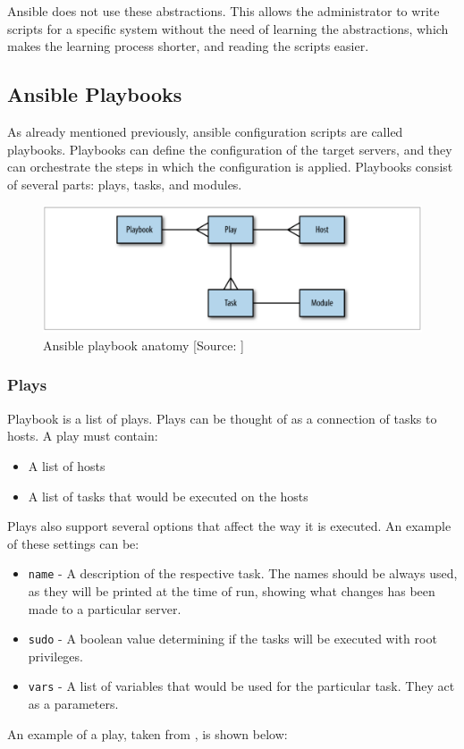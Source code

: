 Ansible does not use these abstractions. This allows the administrator to write scripts for a specific system without the need of learning the abstractions, which makes the learning process shorter, and reading the scripts easier. \cite{UpAndRunning}


\subsection{Ansible Playbooks}
As already mentioned previously, ansible configuration scripts are called playbooks. Playbooks can define the configuration of the target servers, and they can orchestrate the steps in which the configuration is applied. Playbooks consist of several parts: plays, tasks, and modules. \cite{UpAndRunning} \cite{AnsibleDoc}

\begin{figure}[!h]
  \includegraphics[width=\textwidth]{fig/playbook_anatomy.png}
  \caption{Ansible playbook anatomy [Source: \cite{UpAndRunning}]}
  \label{fig:playbook_anatomy}
\end{figure}

\subsubsection*{Plays}

Playbook is a list of plays. Plays can be thought of as a connection of tasks to hosts. A play must contain:
\begin{itemize}
  \item{A list of hosts}
  \item{A list of tasks that would be executed on the hosts}
\end{itemize}
Plays also support several options that affect the way it is executed. An example of these settings can be:
\begin{itemize}
  \item{\texttt{name} - A description of the respective task. The names should be always used, as they will be printed} at the time of run, showing what changes has been made to a particular server.
  \item{\texttt{sudo} - A boolean value determining if the tasks will be executed with root privileges.}
  \item{\texttt{vars} - A list of variables that would be used for the particular task. They act as a parameters.}
\end{itemize}
An example of a play, taken from \cite{UpAndRunning}, is shown below:

